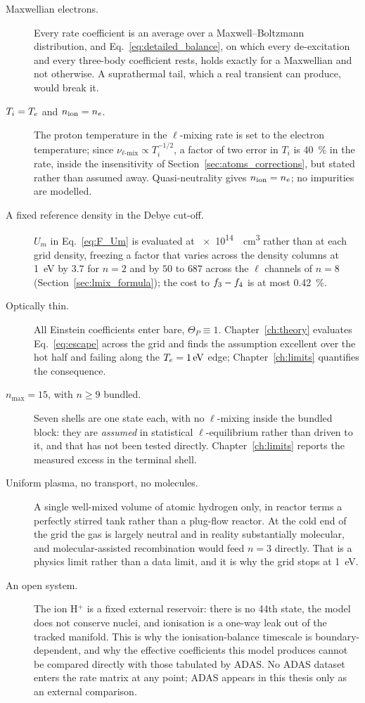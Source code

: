 \begin{description}
  \item[Maxwellian electrons.] Every rate coefficient is an average over a
    Maxwell--Boltzmann distribution, and Eq.~\eqref{eq:detailed_balance}, on
    which every de-excitation and every three-body coefficient rests, holds
    exactly for a Maxwellian and not otherwise. A suprathermal tail, which a
    real transient can produce, would break it.
  \item[$T_i = T_e$ and $n_{\mathrm{ion}} = n_e$.] The proton temperature in the
    $\ell$-mixing rate is set to the electron temperature; since
    $\nu_{\ell\text{-mix}} \propto T_i^{-1/2}$, a factor of two error in $T_i$
    is \SI{40}{\percent} in the rate, inside the insensitivity of
    Section~\ref{sec:atoms_corrections}, but stated rather than assumed away.
    Quasi-neutrality gives $n_{\mathrm{ion}} = n_e$; no impurities are modelled.
  \item[A fixed reference density in the Debye cut-off.] $U_m$ in
    Eq.~\eqref{eq:F_Um} is evaluated at \SI{e14}{\per\cubic\centi\metre} rather
    than at each grid density, freezing a factor that varies across the density
    columns at \SI{1}{\electronvolt} by $3.7$ for $n=2$ and by $50$ to $687$
    across the $\ell$ channels of $n=8$ (Section~\ref{sec:lmix_formula}); the cost to
    $f_{3}-f_{4}$ is at most \SI{0.42}{\percent}.
  \item[Optically thin.] All Einstein coefficients enter bare,
    $\Theta_P \equiv 1$. Chapter~\ref{ch:theory} evaluates
    Eq.~\eqref{eq:escape} across the grid and finds the assumption excellent
    over the hot half and failing along the $T_e = \SI{1}{\electronvolt}$ edge;
    Chapter~\ref{ch:limits} quantifies the consequence.
  \item[$n_{\max} = 15$, with $n \ge 9$ bundled.] Seven shells are one state
    each, with no $\ell$-mixing inside the bundled block: they are \emph{assumed}
    in statistical $\ell$-equilibrium rather than driven to it, and that has not
    been tested directly. Chapter~\ref{ch:limits} reports the measured excess in
    the terminal shell.
  \item[Uniform plasma, no transport, no molecules.] A single well-mixed volume
    of atomic hydrogen only, in reactor terms a perfectly stirred tank rather
    than a plug-flow reactor. At the cold end of the grid the gas is largely neutral
    and in reality substantially molecular, and molecular-assisted recombination
    would feed $n=3$ directly. That is a physics limit rather than a data limit,
    and it is why the grid stops at \SI{1}{\electronvolt}.
  \item[An open system.] The ion H$^{+}$ is a fixed external reservoir: there is
    no 44th state, the model does not conserve nuclei, and ionisation is a
    one-way leak out of the tracked manifold. This is why the ionisation-balance
    timescale is boundary-dependent, and why the effective coefficients this
    model produces cannot be compared directly with those tabulated by
    ADAS. No ADAS dataset enters the rate matrix at any point; ADAS appears in
    this thesis only as an external comparison.
\end{description}

